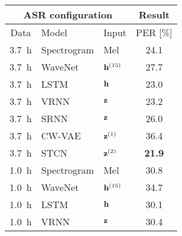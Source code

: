 {\begin{table}
\begin{subtable}[t]{.485\textwidth}
\begin{adjustbox}{center, totalheight=0.37\paperheight}
    \end{adjustbox}
    \label{tab: likelihoods timit}
    \end{subtable}%
    \hfill
    \begin{subtable}[t]{.485\textwidth}
    \centering
    \begin{adjustbox}{center, totalheight=0.37\paperheight}
    \begin{tabular}[t]{cll|c}
        \toprule
        \multicolumn{3}{c}{\bfseries ASR configuration} & \multicolumn{1}{c}{\textbf{Result}} \\
        \midrule
        Data   &  Model           & Input         &  PER [\%]  \\
                \midrule
        \SI{3.7}{h}   &  Spectrogram     & Mel           &   24.1   \\  %
        \SI{3.7}{h}   &  WaveNet         & ${\mathbf{h}}^{(15)}$  &   27.7   \\  %
        \SI{3.7}{h}   &  LSTM            & ${\mathbf{h}}$         &   23.0   \\  %
        \SI{3.7}{h}   &  VRNN            & ${\mathbf{z}}$         &   23.2   \\  %
        \SI{3.7}{h}   &  SRNN            & ${\mathbf{z}}$         &   26.0   \\  %
        \SI{3.7}{h}   &  CW-VAE          & ${\mathbf{z}}^{(1)}$   &   36.4   \\  %
        \SI{3.7}{h}   &  STCN            & ${\mathbf{z}}^{(2)}$   &   \textbf{21.9}   \\  %
        \midrule
        \SI{1.0}{h}   &  Spectrogram     & Mel           &   30.8   \\  %
        \SI{1.0}{h}   &  WaveNet         & ${\mathbf{h}}^{(15)}$  &   34.7   \\  %
        \SI{1.0}{h}   &  LSTM            & ${\mathbf{h}}$         &   30.1   \\  %
        \SI{1.0}{h}   &  VRNN            & ${\mathbf{z}}$         &   30.4   \\  %

\end{tabular}
\end{adjustbox}
\end{subtable}
\end{table}}
